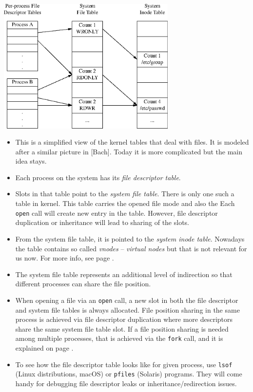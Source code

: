 
\begin{slide}
\begin{center}
%
\includegraphics[width=89mm]{img/eps/open_files1.eps}
\end{center}
\end{slide}

\label{OPENFILETABLES}

\begin{itemize}
\item This is a simplified view of the kernel tables that deal with files.  It
is modeled after a similar picture in [Bach].  Today it is more complicated but
the main idea stays.
\item Each process on the system has its \emph{file descriptor table}.
\item Slots in that table point to the \emph{system file table}.  There is
only one such a table in kernel.  This table carries the opened file mode and
also the  Each \texttt{open} call will create
new entry in the table. However, file descriptor duplication or inheritance
will lead to sharing of the slots.
\item From the system file table, it is pointed to the \emph{system inode
table}.  Nowadays the table contains so called \emph{vnodes} -- \emph{virtual
nodes} but that is not relevant for us now. For more info, see page
\pageref{VFS}.
\item The system file table represents an additional level of indirection so
that different processes can share the file position.
\item When opening a file via an \texttt{open} call, a new slot in both the file
descriptor and system file tables is always allocated.  File position sharing in
the same process is achieved via file descriptor duplication where more
descriptors share the same system file table slot.  If a file position sharing
is needed among multiple processes, that is achieved via the \texttt{fork}
call, and it is explained on page \pageref{FDSHARING}.
\item To see how the file descriptor table looks like for given process,
use \texttt{lsof} (Linux distributions, macOS) or \texttt{pfiles} (Solaris)
programs. They will come handy for debugging file descriptor leaks or
inheritance/redirection issues.
\end{itemize}

